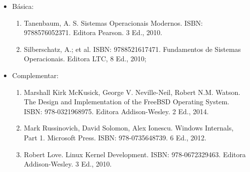 \begin{itemize} 
  \item Básica:
	\begin{enumerate}
		\item Tanenbaum, A. S. Sistemas Operacionais Modernos. ISBN: 9788576052371. Editora Pearson. 3 Ed., 2010. 
		\item Silberschatz, A.; et al. ISBN: 9788521617471. Fundamentos de Sistemas Operacionais. Editora LTC, 8 Ed., 2010; 
	\end{enumerate}
  \item Complementar:
	\begin{enumerate} 
		\item Marshall Kirk McKusick, George V. Neville-Neil, Robert N.M. Watson. The Design and Implementation of the FreeBSD Operating System. ISBN: 978-0321968975. Editora Addison-Wesley. 2 Ed., 2014.
		\item Mark Russinovich, David Solomon, Alex Ionescu. Windows Internals, Part 1. Microsoft Press. ISBN: 978-0735648739. 6 Ed., 2012.
		\item Robert Love. Linux Kernel Development. ISBN: 978-0672329463. Editora Addison-Wesley. 3 Ed., 2010.
	\end{enumerate}
\end{itemize}
